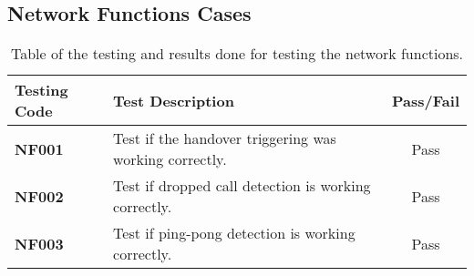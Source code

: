 \subsection{Network Functions Cases}
\begin{table}[H]
  \begin{center}
    \begin{tabular}{| l | p{8cm} | c |}
  	  \hline
      \textbf{Testing Code} & \textbf{Test Description} & \textbf{Pass/Fail} \\ \hline
      \textbf{NF001} & Test if the handover triggering was working correctly. & Pass \\ \hline
      \textbf{NF002} & Test if dropped call detection is working correctly. & Pass \\ \hline
   	  \textbf{NF003} & Test if ping-pong detection is working correctly. & Pass \\ \hline
  	\end{tabular}
  \end{center}
  \caption{Table of the testing and results done for testing the network functions.}
  \label{tab:test_network}
\end{table}